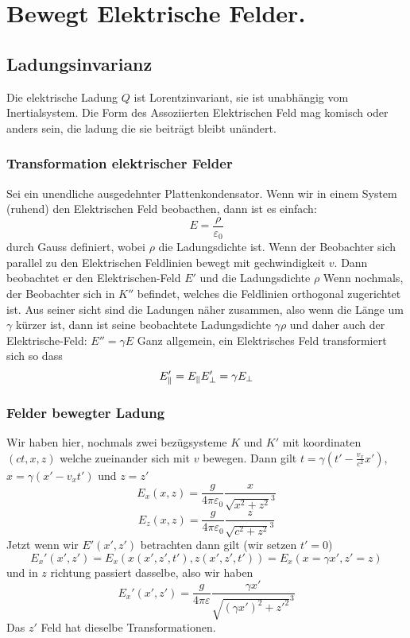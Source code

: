 \documentclass{article}
\begin{document}
\section*{Bewegt Elektrische Felder.}
\subsection*{Ladungsinvarianz}
Die elektrische Ladung $Q$ ist Lorentzinvariant, sie ist unabhängig vom Inertialsystem. Die Form  des Assoziierten Elektrischen Feld mag komisch oder anders sein, die ladung die sie beiträgt bleibt unändert.
\subsubsection*{Transformation elektrischer Felder}
Sei ein unendliche ausgedehnter Plattenkondensator. Wenn wir in einem System (ruhend) den Elektrischen Feld beobacthen, dann ist es einfach:\[E=\frac{\rho}{\varepsilon_0}\] durch Gauss definiert, wobei $\rho$ die Ladungsdichte ist.\newline
Wenn der Beobachter sich parallel zu den Elektrischen Feldlinien bewegt mit gechwindigkeit $v$. Dann beobachtet er den Elektrischen-Feld $E'$ und die Ladungsdichte $\rho$
\newline Wenn nochmals, der Beobachter sich in $K''$ befindet, welches die Feldlinien orthogonal zugerichtet ist. Aus seiner sicht sind die Ladungen näher zusammen, also wenn die Länge um $\gamma$ kürzer ist, dann ist seine beobachtete Ladungsdichte $\gamma \rho$ und daher auch der Elektrische-Feld: $E''=\gamma E$
Ganz allgemein, ein Elektrisches Feld transformiert sich so dass \[E'_{\parallel}=E_{\parallel}\\E'_\perp=\gamma E_\perp\]
\subsubsection*{Felder bewegter Ladung}Wir haben hier, nochmals zwei bezügsysteme $K$ und $K'$ mit koordinaten $(ct,x,z)$ welche zueinander sich mit $v$ bewegen. Dann gilt $t=\gamma(t'-\frac{v_x}{c^2}x')$, $x=\gamma(x'-v_xt')$ und $z=z'$
\[E_x(x,z)=\frac{g}{4\pi\varepsilon_0}\frac{x}{\sqrt{x^2+z^2}^3}\]\[E_z(x,z)=\frac{g}{4\pi\varepsilon_0}\frac{z}{\sqrt{c^2+z^2}^3}\]
Jetzt wenn wir $E'(x',z')$ betrachten dann gilt (wir setzen $t'=0$)\[E_x'(x',z')=E_x(x(x',z',t'),z(x',z',t'))=E_x(x=\gamma x',z'=z)\]
und in $z$ richtung passiert dasselbe, also wir haben \[E_x'(x',z')=\frac{g}{4\pi\varepsilon}\frac{\gamma x'}{\sqrt{(\gamma x')^2+z'^2}^3}\]
Das $z'$ Feld hat dieselbe Transformationen.
\end{document}

